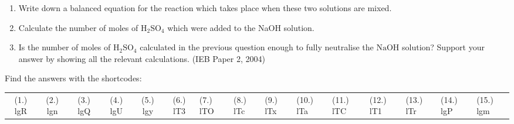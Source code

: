 \begin{enumerate}[noitemsep, label=\textbf{\arabic*}. ]
\begin{enumerate}[noitemsep, label=\textbf{\alph*}. ]
\label{m38712*uid158}\item Write down a balanced equation for the reaction which takes place when these two solutions are mixed.
\label{m38712*uid159}\item Calculate the number of moles of $\mathrm{H}{}_{2}\mathrm{SO}{}_{4}$ which were added to the NaOH solution.
\label{m38712*uid160}\item Is the number of moles of $\mathrm{H}{}_{2}\mathrm{SO}{}_{4}$ calculated in the previous question enough to fully neutralise the $\mathrm{NaOH}$ solution? Support your answer by showing all the relevant calculations.
(IEB Paper 2, 2004)
\end{enumerate}
                \end{enumerate}
  \label{m38712**end}
  \label{0044f0dab6cfd2ca2bac282dc4009886**end}
\par {} Find the answers with the shortcodes:
 \par \begin{tabular}[h]{cccccc}
 (1.) lgR  &  (2.) lgn  &  (3.) lgQ  &  (4.) lgU  &  (5.) lgy  &  (6.) lT3  &  (7.) lTO  &  (8.) lTc  &  (9.) lTx  &  (10.) lTa  &  (11.) lTC  &  (12.) lT1  &  (13.) lTr  &  (14.) lgP  &  (15.) lgm  & \end{tabular}
